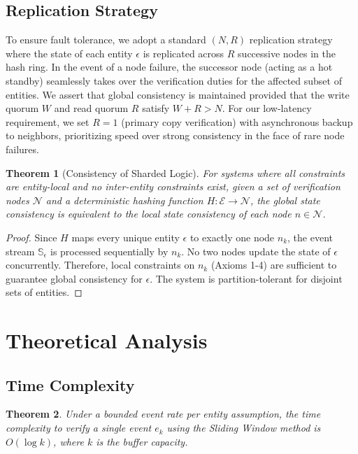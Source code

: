 \documentclass[conference]{IEEEtran}
\newtheorem{theorem}{Theorem}
\begin{document}
\subsection{Replication Strategy}
To ensure fault tolerance, we adopt a standard $(N, R)$ replication strategy where the state of each entity $\epsilon$ is replicated across $R$ successive nodes in the hash ring. In the event of a node failure, the successor node (acting as a hot standby) seamlessly takes over the verification duties for the affected subset of entities. We assert that global consistency is maintained provided that the write quorum $W$ and read quorum $R$ satisfy $W + R > N$. For our low-latency requirement, we set $R=1$ (primary copy verification) with asynchronous backup to neighbors, prioritizing speed over strong consistency in the face of rare node failures.

\begin{theorem}[Consistency of Sharded Logic]
For systems where all constraints are entity-local and no inter-entity constraints exist, given a set of verification nodes $\mathcal{N}$ and a deterministic hashing function $H: \mathcal{E} \to \mathcal{N}$, the global state consistency is equivalent to the local state consistency of each node $n \in \mathcal{N}$.
\end{theorem}

\begin{proof}
Since $H$ maps every unique entity $\epsilon$ to exactly one node $n_k$, the event stream $\mathbb{S}_\epsilon$ is processed sequentially by $n_k$. No two nodes update the state of $\epsilon$ concurrently. Therefore, local constraints on $n_k$ (Axioms 1-4) are sufficient to guarantee global consistency for $\epsilon$. The system is partition-tolerant for disjoint sets of entities.
\end{proof}

\section{Theoretical Analysis}

\subsection{Time Complexity}

\begin{theorem}
Under a bounded event rate per entity assumption, the time complexity to verify a single event $e_k$ using the Sliding Window method is $O(\log k)$, where $k$ is the buffer capacity.
\end{theorem}
\end{document}
